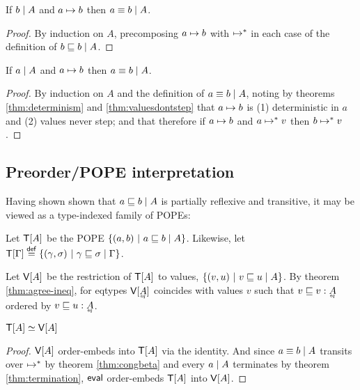 \documentclass{article}
\newcommand{\ordeq}{\simeq}
\newcommand{\lrof}[1]{\ms{T}[#1]}
\newcommand{\Val}[1]{\ms{V}[#1]}
\begin{document}
\begin{lemma}
  If $\lr{A}{b}$ and $a \step b$ then $\lr{A}{a \aeq b}$.
\end{lemma}

\begin{proof}
  By induction on $A$, precomposing $a \step b$ with $\steps$ in each case of
  the definition of $\lr{A}{b \ale b}$.
\end{proof}

\begin{lemma}
  If $\lr{A}{a}$ and $a \step b$ then $\lr{A}{a \aeq b}$.
\end{lemma}

\begin{proof}
  By induction on $A$ and the definition of $\lr{A}{a \aeq b}$, noting by
  theorems \ref{thm:determinism} and \ref{thm:valuesdontstep} that $a \step b$
  is (1) deterministic in $a$ and (2) values never step; and that therefore if
  $a \step b$ and $a \steps v$ then $b \steps v$.
\end{proof}


\subsection{Preorder/POPE interpretation}

Having shown shown that $\lr{A}{a \ale b}$ is partially reflexive and
transitive, it may be viewed as a type-indexed family of POPEs:

\begin{definition}
  Let $\lrof{A}$ be the POPE $\setfor{(a,b)}{\lr{A}{a \ale b}}$. Likewise, let
  $\lrof{\GG} \defeq \setfor{(\gamma,\sigma)}{\lr{\GG}{\gamma \ale \sigma}}$.
\end{definition}

\begin{definition}
  Let $\Val{A}$ be the restriction of $\lrof{A}$ to values,
  $\setfor{(v,u)}{\lr{A}{v \ale u}}$. By theorem \ref{thm:agree-ineq}, for
  eqtypes $\Val{\eq{A}}$ coincides with values $v$ such that $v \ale v : \eq{A}$
  ordered by $v \ale u : \eq{A}$.
\end{definition}

\begin{theorem}\label{thm:terms-values-ordeq}
  $\lrof{A} \ordeq \Val{A}$
\end{theorem}
\begin{proof}
  $\Val{A}$ order-embeds into $\lrof{A}$ via the identity. And since $\lr{A}{a
    \equiv b}$ transits over $\steps$ by theorem \ref{thm:congbeta} and every
  $\lr{A}{a}$ terminates by theorem \ref{thm:termination}, $\evalfn$
  order-embeds $\lrof{A}$ into $\Val{A}$.
\end{proof}
\end{document}
